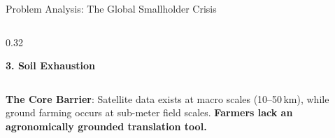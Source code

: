 \documentclass[aspectratio=169,10pt]{beamer}
\begin{document}
\begin{frame}{Problem Analysis: The Global Smallholder Crisis}
\begin{columns}[T]
\begin{column}{0.32\textwidth}
\begin{alertblock}{\textbf{3. Soil Exhaustion}}
\begin{itemize}
                \end{itemize}
            \end{alertblock}
        \end{column}
    \end{columns}
    \vspace{0.3cm}
    \begin{center}
        \footnotesize \textbf{The Core Barrier}: Satellite data exists at macro scales (10--50\,km), while ground farming occurs at sub-meter field scales. \textbf{Farmers lack an agronomically grounded translation tool.}
    \end{center}
\end{frame}

\end{document}

